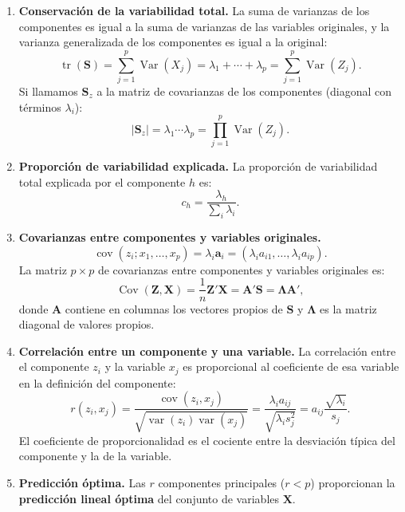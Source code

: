 \documentclass[12pt, a4paper]{article}
\theoremstyle{plain}
\theoremstyle{definition}
\theoremstyle{remark}
\newcommand{\mat}[1]{\mathbf{#1}}
\newcommand{\tr}{\operatorname{tr}}
\newcommand{\Var}{\operatorname{Var}}
\newcommand{\Cov}{\operatorname{Cov}}
\begin{document}
\begin{enumerate}
  \item \textbf{Conservación de la variabilidad total.}
        La suma de varianzas de los componentes es igual a la suma de varianzas
        de las variables originales, y la varianza generalizada de los
        componentes es igual a la original:
        \[
          \tr(\mat{S}) = \sum_{j=1}^p\Var(X_j)
          = \lambda_1+\cdots+\lambda_p
          = \sum_{j=1}^p\Var(Z_j).
        \]
        Si llamamos $\mat{S}_z$ a la matriz de covarianzas de los componentes
        (diagonal con términos $\lambda_i$):
        \[
          |\mat{S}_z| = \lambda_1\cdots\lambda_p
          = \prod_{j=1}^p\Var(Z_j).
        \]

  \item \textbf{Proporción de variabilidad explicada.}
        La proporción de variabilidad total explicada por el componente $h$ es:
        \[
          c_h = \frac{\lambda_h}{\sum_{i}\lambda_i}.
        \]

  \item \textbf{Covarianzas entre componentes y variables originales.}
        \[
          \operatorname{cov}(z_i;x_1,\dots,x_p) = \lambda_i\mathbf{a}_i
          = (\lambda_i a_{i1},\dots,\lambda_i a_{ip}).
        \]
        La matriz $p\times p$ de covarianzas entre componentes y variables
        originales es:
        \[
          \Cov(\mathbf{Z},\mathbf{X}) = \frac{1}{n}\mat{Z}'\mathbf{X}
          = \mat{A}'\mat{S} = \boldsymbol{\Lambda}\mat{A}',
        \]
        donde $\mat{A}$ contiene en columnas los vectores propios de $\mat{S}$
        y $\boldsymbol{\Lambda}$ es la matriz diagonal de valores propios.

  \item \textbf{Correlación entre un componente y una variable.}
        La correlación entre el componente $z_i$ y la variable $x_j$ es
        proporcional al coeficiente de esa variable en la definición del
        componente:
        \[
          r(z_i,x_j)
          = \frac{\operatorname{cov}(z_i,x_j)}{\sqrt{\operatorname{var}(z_i)\operatorname{var}(x_j)}}
          = \frac{\lambda_i a_{ij}}{\sqrt{\lambda_i s_j^2}}
          = a_{ij}\frac{\sqrt{\lambda_i}}{s_j}.
        \]
        El coeficiente de proporcionalidad es el cociente entre la desviación
        típica del componente y la de la variable.

  \item \textbf{Predicción óptima.}
        Las $r$ componentes principales ($r<p$) proporcionan la
        \textbf{predicción lineal óptima} del conjunto de variables $\mathbf{X}$.
\end{enumerate}
\end{document}
